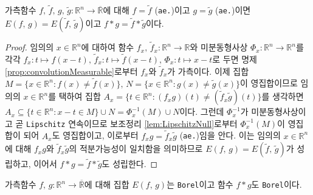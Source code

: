 \begin{theorem}\label{thm:aeConvolution}
    가측함수 $f,\,\widetilde{f},\,g,\,\widetilde{g}:\mathbb{R}^n\to\overline{\mathbb{R}}$에 대해 $f=\widetilde{f}$ (\texttt{ae.})이고 $g=\widetilde{g}$ (\texttt{ae.})이면 $E(f,\,g)=E(\widetilde{f},\,\widetilde{g})$이고 $f*g=\widetilde{f}*\widetilde{g}$이다.
\end{theorem}

\begin{proof}
    임의의 $x\in\mathbb{R}^n$에 대하여 함수 $f_x,\,\widetilde{f}_x:\mathbb{R}^n\to\mathbb{R}$와 미분동형사상 $\Phi_x:\mathbb{R}^n\to\mathbb{R}^n$를 각각 $f_x:t\mapsto f(x-t),\,\widetilde{f}_x:t\mapsto\widetilde{f}(x-t),\,\Phi_x:t\mapsto x-t$로 두면 명제 \ref{prop:convolutionMeasurable}로부터 $f_x$와 $\widetilde{f}_x$가 가측이다. 이제 집합 $M=\{x\in\mathbb{R}^n:f(x)\ne\widetilde{f}(x)\},\,N=\{x\in\mathbb{R}^n:g(x)\ne\widetilde{g}(x)\}$이 영집합이므로 임의의 $x\in\mathbb{R}^n$를 택하여 집합 $A_x=\{t\in\mathbb{R}^n:(f_xg)(t)\ne(\widetilde{f}_x\widetilde{g})(t)\}$를 생각하면 $A_x\subseteq\{t\in\mathbb{R}^n:x-t\in M\}\cup N=\Phi_x^{-1}(M)\cup N$이다. 그런데 $\Phi_x^{-1}$가 미분동형사상이고 곧 \texttt{Lipschitz} 연속이므로 보조정리 \ref{lem:LipschitzNull}로부터 $\Phi_x^{-1}(M)$이 영집합이 되어 $A_x$도 영집합이고, 이로부터 $f_xg=\widetilde{f}_x\widetilde{g}$ (\texttt{ae.})임을 안다. 이는 임의의 $x\in\mathbb{R}^n$에 대해 $f_xg$와 $\widetilde{f}_x\widetilde{g}$의 적분가능성이 일치함을 의미하므로 $E(f,\,g)=E(\widetilde{f},\,\widetilde{g})$가 성립하고, 이어서 $f*g=\widetilde{f}*\widetilde{g}$도 성립한다.
\end{proof}

\begin{theorem}\label{thm:convolutionBorel}
    가측함수 $f,\,g:\mathbb{R}^n\to\overline{\mathbb{R}}$에 대해 집합 $E(f,\,g)$는 \texttt{Borel}이고 함수 $f*g$도 \texttt{Borel}이다.
\end{theorem}

